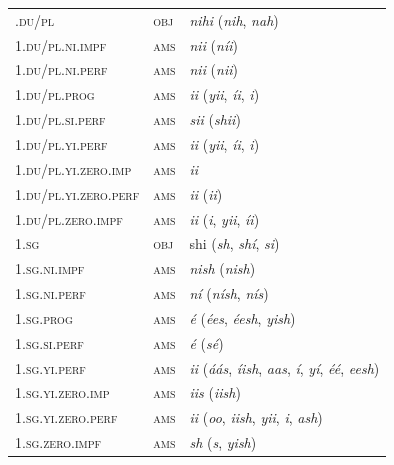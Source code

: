 \begin{xltabular}{\textwidth}{llX}
    \endfoot  
    .\textsc{du}/\textsc{pl} & \textsc{obj} & \textit{nihi} (\textit{nih}, \textit{nah})\\                 
 1.\textsc{du}/\textsc{pl}.\textsc{ni}.\textsc{impf} & \textsc{ams} &  \textit{nii }(\textit{níi})\\
 1.\textsc{du}/\textsc{pl}.\textsc{ni}.\textsc{perf} & \textsc{ams} &  \textit{nii} (\textit{nii})\\
 1.\textsc{du}/\textsc{pl}.\textsc{prog} & \textsc{ams} &  \textit{ii} (\textit{yii}, \textit{íi}, \textit{i})\\
 1.\textsc{du}/\textsc{pl}.\textsc{si}.\textsc{perf} & \textsc{ams} &  \textit{sii} (\textit{shii})\\
 1.\textsc{du}/\textsc{pl}.\textsc{yi}.\textsc{perf} & \textsc{ams} &  \textit{ii} (\textit{yii}, \textit{íi}, \textit{i})\\
 1.\textsc{du}/\textsc{pl}.\textsc{yi}.\textsc{zero}.\textsc{imp} & \textsc{ams} &  \textit{ii}\\
 1.\textsc{du}/\textsc{pl}.\textsc{yi}.\textsc{zero}.\textsc{perf} & \textsc{ams} &  \textit{ii} (\textit{ii})\\
 1.\textsc{du}/\textsc{pl}.\textsc{zero}.\textsc{impf} & \textsc{ams} &  \textit{ii} (\textit{i}, \textit{yii}, \textit{íi})\\
 1.\textsc{sg} & \textsc{obj} & shi (\textit{sh}, \textit{shí}, \textit{si})\\
 1.\textsc{sg}.\textsc{ni}.\textsc{impf} & \textsc{ams} &  \textit{nish} (\textit{nish})\\
 1.\textsc{sg}.\textsc{ni}.\textsc{perf} & \textsc{ams} &  \textit{ní} (\textit{nísh}, \textit{nís})\\
 1.\textsc{sg}.\textsc{prog} & \textsc{ams} &  \textit{é} (\textit{ées}, \textit{éesh}, \textit{yish})\\
 1.\textsc{sg}.\textsc{si}.\textsc{perf} & \textsc{ams} &  \textit{é} (\textit{sé})\\
 1.\textsc{sg}.\textsc{yi}.\textsc{perf} & \textsc{ams} &  \textit{ii} (\textit{áás}, \textit{íish}, \textit{aas}, \textit{í}, \textit{yí}, \textit{éé}, \textit{eesh})\\
 1.\textsc{sg}.\textsc{yi}.\textsc{zero}.\textsc{imp} & \textsc{ams} &  \textit{iis} (\textit{iish})\\
 1.\textsc{sg}.\textsc{yi}.\textsc{zero}.\textsc{perf} & \textsc{ams} &  \textit{ii} (\textit{oo}, \textit{iish}, \textit{yii}, \textit{i}, \textit{ash})\\
 1.\textsc{sg}.\textsc{zero}.\textsc{impf} & \textsc{ams} &  \textit{sh} (\textit{s}, \textit{yish})\\

\end{xltabular}
